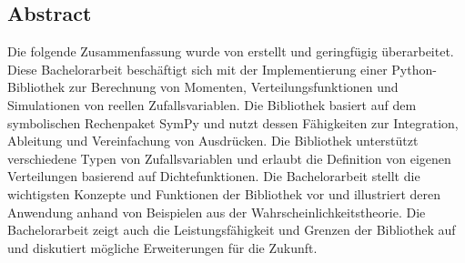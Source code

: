 \subsection*{Abstract}

Die folgende Zusammenfassung wurde von \href{https://copilot.microsoft.com/}{} erstellt und geringfügig überarbeitet.\\

Diese Bachelorarbeit beschäftigt sich mit der Implementierung einer Python-Bibliothek zur Berechnung von Momenten, Verteilungsfunktionen und Simulationen von reellen Zufallsvariablen. Die Bibliothek basiert auf dem symbolischen Rechenpaket SymPy und nutzt dessen Fähigkeiten zur Integration, Ableitung und Vereinfachung von Ausdrücken. Die Bibliothek unterstützt verschiedene Typen von Zufallsvariablen und erlaubt die Definition von eigenen Verteilungen basierend auf Dichtefunktionen. Die Bachelorarbeit stellt die wichtigsten Konzepte und Funktionen der Bibliothek vor und illustriert deren Anwendung anhand von Beispielen aus der Wahrscheinlichkeitstheorie. Die Bachelorarbeit zeigt auch die Leistungsfähigkeit und Grenzen der Bibliothek auf und diskutiert mögliche Erweiterungen für die Zukunft.